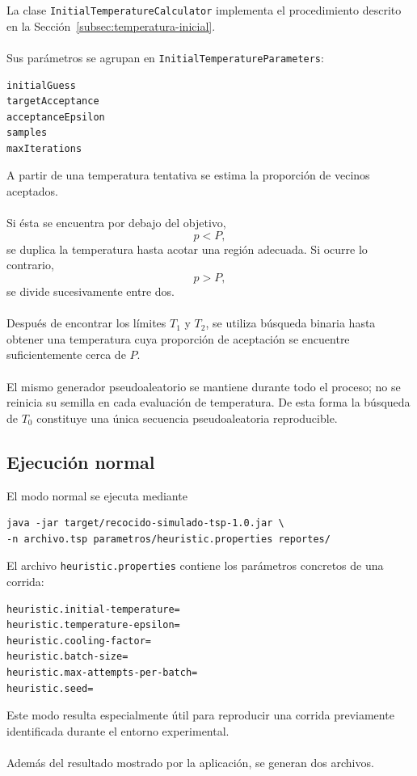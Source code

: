 \documentclass[12pt]{article}
\begin{document}
La clase \texttt{InitialTemperatureCalculator} implementa el procedimiento
descrito en la Sección~\ref{subsec:temperatura-inicial}.
\\\\
Sus parámetros se agrupan en
\texttt{InitialTemperatureParameters}:
\begin{verbatim}
initialGuess
targetAcceptance
acceptanceEpsilon
samples
maxIterations
\end{verbatim}
A partir de una temperatura tentativa se estima la proporción de vecinos
aceptados.
\\\\
Si ésta se encuentra por debajo del objetivo,
\[
    p<P,
\]
se duplica la temperatura hasta acotar una región adecuada. Si ocurre lo
contrario,
\[
    p>P,
\]
se divide sucesivamente entre dos.
\\\\
Después de encontrar los límites \(T_1\) y \(T_2\), se utiliza búsqueda
binaria hasta obtener una temperatura cuya proporción de aceptación se
encuentre suficientemente cerca de \(P\).
\\\\
El mismo generador pseudoaleatorio se mantiene durante todo el proceso; no
se reinicia su semilla en cada evaluación de temperatura. De esta forma la
búsqueda de \(T_0\) constituye una única secuencia pseudoaleatoria
reproducible.

\subsection{Ejecución normal}

El modo normal se ejecuta mediante
\begin{verbatim}
java -jar target/recocido-simulado-tsp-1.0.jar \
-n archivo.tsp parametros/heuristic.properties reportes/
\end{verbatim}
El archivo \texttt{heuristic.properties} contiene los parámetros concretos
de una corrida:
\begin{verbatim}
heuristic.initial-temperature=
heuristic.temperature-epsilon=
heuristic.cooling-factor=
heuristic.batch-size=
heuristic.max-attempts-per-batch=
heuristic.seed=
\end{verbatim}
Este modo resulta especialmente útil para reproducir una corrida previamente
identificada durante el entorno experimental.
\\\\
Además del resultado mostrado por la aplicación, se generan dos archivos.
\end{document}
